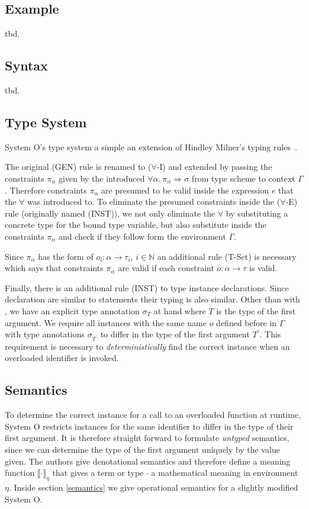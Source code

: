 \documentclass[runningheads]{llncs}
\newcommand{\snip}[1]{\footnotesize{\ttfamily{#1}}}
\begin{document}
\subsection{Example}
tbd.

\subsection{Syntax}
tbd.
\subsection{Type System}
System O's type system a simple an extension of Hindley Milner's typing rules~\cite{dm82}. 

The original (GEN) rule is renamed to ($\forall$-I) and extended by passing the constraints $\pi_\alpha$ given by the introduced $\forall \alpha. \ \pi_\alpha \Rightarrow \sigma$ from type scheme to context $\Gamma$. Therefore constraints $\pi_\alpha$ are presumed to be valid inside the expression $e$ that the $\forall$ was introduced to. To eliminate the presumed constraints inside the ($\forall$-E) rule (originally named (INST)), we not only eliminate the $\forall$ by substituting a concrete type for the bound type variable, but also substitute inside the constraints $\pi_\alpha$ and check if they follow form the environment $\Gamma$. 

Since $\pi_\alpha$ has the form of $o_i : \alpha \rightarrow \tau_i$, $i \in \mathbb{N}$ an additional rule (T-Set) is necessary which says that constraints $\pi_\alpha$ are valid if each constraint $o: \alpha \rightarrow \tau$ is valid.

Finally, there is an additional rule (INST) to type instance declarations. Since \snip{inst} declaration are similar to \snip{let} statements their typing is also similar. Other than with \snip{let}, we have an explicit type annotation $\sigma_T$ at hand where $T$ is the type of the first argument. We require all instances with the same name $o$ defined before in $\Gamma$ with type annotations $\sigma_{T^\prime}$ to differ in the type of the first argument $T^\prime$. This requirement is necessary to \emph{deterministically} find the correct instance when an overloaded identifier is invoked.
\subsection{Semantics}
To determine the correct instance for a call to an overloaded function at runtime, System O restricts instances for the same identifier to differ in the type of their first argument. It is therefore straight forward to formulate \emph{untyped} semantics, since we can determine the type of the first argument uniquely by the value given. The authors give denotational semantics and therefore define a meaning function $\llbracket \cdot \rrbracket_\eta$ that gives a term or type $\cdot$ a mathematical meaning in environment $\eta$. Inside section \ref{semantics} we give operational semantics for a slightly modified System O. 
\end{document}
